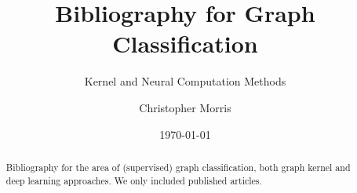 \documentclass[	
	paper = a4,
	fontsize = 11pt,
	DIV = 12,
	abstract = true
]{scrartcl}
\theoremstyle{plain}
\theoremstyle{definition}
\begin{document}
\title{Bibliography for Graph Classification}
\subtitle{Kernel and Neural Computation Methods}

\renewcommand\Affilfont{\large}
\renewcommand\Authfont{\large}
\setlength{\affilsep}{0.5em}
\author[*]{Christopher Morris}
\date{\vspace*{-1.0em}\small\today\vspace*{-1.0em}}

\maketitle

\begin{abstract}
Bibliography for the area of (supervised) graph classification, both graph kernel and deep learning approaches. We only included published articles.
\end{abstract}

\nocite{*}


\printbibliography[keyword=deep, title={Deep Learning}]
\printbibliography[keyword=kernel, title={Kernel Methods}]
\end{document}
